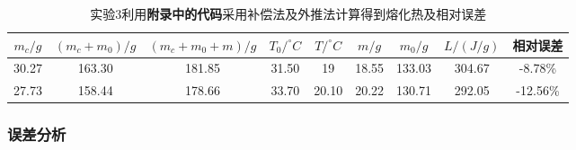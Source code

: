 \documentclass[dvipsnames, svgnames,a4paper,11pt]{article}
\begin{document}
\begin{enumerate}
		\begin{table}[h]
			\centering
			\begin{tabular}{|c|c|c|c|c|c|c|c|c|}
				\hline
				$m_c/g$ & $(m_c+m_0)/g$ & $(m_c+m_0+m)/g$ & $T_0/^\circ C$ & $T/^\circ C$ & $m/g$ & $m_0/g$ & $L/(J/g)$ & 相对误差 \\
				\hline
				30.27 & 163.30 & 181.85 & 31.50 & 19 & 18.55 & 133.03 & 304.67 & -8.78\% \\
				27.73 & 158.44 & 178.66 & 33.70 & 20.10 & 20.22 & 130.71 & 292.05 & -12.56\% \\
				\hline
			\end{tabular}
			\caption{实验3利用\textbf{附录中的代码}采用补偿法及外推法计算得到熔化热及相对误差}
			\label{tab:tab8}
		\end{table}
		
	\end{enumerate}
	
	\subsubsection{误差分析}
	
\end{document}
